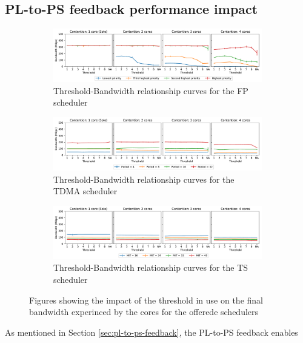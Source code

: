 \subsection{PL-to-PS feedback performance impact}
\label{sec:feedback-pressure}
\begin{figure}[]
  \centering
  \begin{subfigure}{0.9\textwidth}
    \centering
    \includegraphics[scale=0.4]{images/fp.pdf}
    \caption{Threshold-Bandwidth relationship curves for the FP scheduler}
    \label{fig:threshold_fp}
  \end{subfigure}
  \hfill
  \begin{subfigure}{0.9\textwidth}
    \centering
    \includegraphics[scale=0.4]{images/tdma.pdf}
    \caption{Threshold-Bandwidth relationship curves for the TDMA scheduler}
    \label{fig:threshold_tdma}
  \end{subfigure}
  \hfill
  \begin{subfigure}{0.9\textwidth}
    \centering
    \includegraphics[scale=0.4]{images/ts.pdf}
    \caption{Threshold-Bandwidth relationship curves for the TS scheduler}
    \label{fig:threshold_ts}
  \end{subfigure}
  \caption{Figures showing the impact of the threshold in use on the final bandwidth experinced by the cores for the offerede schedulers}
  \label{fig:schim_threshold}
\end{figure}
As mentioned in Section \ref{sec:pl-to-ps-feedback}, the PL-to-PS feedback enables
